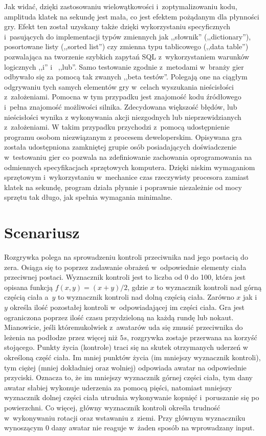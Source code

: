 \documentclass[brudnopis]{xmgr}
\begin{document}
Jak widać, dzięki zastosowaniu wielowątkowości i~zoptymalizowaniu kodu,
amplituda klatek na sekundę jest mała, co jest efektem pożądanym dla
płynności gry. Efekt ten został uzyskany także dzięki
wykorzystaniu specyficznych i~pasujących do implementacji typów zmiennych
jak ,,słownik'' (,,dictionary''), posortowane listy (,,sorted list'') czy
zmienna typu tablicowego (,,data table'') pozwalająca na tworzenie szybkich
zapytań SQL z~wykorzystaniem warunków logicznych ,,i'' i~ ,,lub''.
Samo testowanie zgodnie z~metodami w~branży gier odbywało się za pomocą
tak zwanych ,,beta testów''. Polegają one na ciągłym odgrywaniu tych samych
elementów gry w~celach wyszukania nieścisłości z~założeniami. Pomocna w
tym przypadku jest znajomość kodu źródłowego i~pełna znajomość możliwości
silnika. Zdecydowana większość błędów, lub nieścisłości wynika z
wykonywania akcji niezgodnych lub nieprzewidzianych z~założeniami. W
takim przypadku przychodzi z~pomocą udostępnienie programu osobom niezwiązanym
z procesem deweloperskim. Opisywana gra została udostępniona zamkniętej
grupie osób posiadających doświadczenie w~testowaniu gier co pozwala na
zdefiniowanie zachowania oprogramowania na odmiennych specyfikacjach sprzętowych
komputera. Dzięki niskim wymaganiom sprzętowym i~wykorzystaniu w~mechanice czas
rzeczywisty procesora zamiast klatek na sekundę, program działa płynnie i
poprawnie niezależnie od mocy sprzętu tak długo, jak spełnia wymagania
minimalne.

\section{Scenariusz}
Rozgrywka polega na sprowadzeniu kontroli przeciwnika nad jego postacią
do zera. Osiąga się to poprzez zadawanie obrażeń w~odpowiednie elementy
ciała przeciwnej postaci.
Wyznacznik kontroli jest to liczba od 0 do 100, która jest opisana funkcją
$f(x,y) = (x+y)/2$, gdzie $x$ to
wyznacznik kontroli nad górną częścią ciała a~$y$ to wyznacznik kontroli
nad dolną częścią ciała. Zarówno
$x$ jak i~$y$ określa ilość pozostałej kontroli w~odpowiadającej im części
ciała.
Gra jest ograniczona poprzez ilość czasu przydzieloną na każdą rundę
lub nokaut. Mianowicie, jeśli któremukolwiek z~awatarów uda się zmusić
przeciwnika do leżenia na podłodze przez więcej niż $5s$, rozgrywka zostaje
przerwana na korzyść stojącego.
Punkty życia (kontrole) traci się na skutek otrzymanych uderzeń w
określoną część ciała. Im mniej punktów życia (im mniejszy
wyznacznik kontroli), tym ciężej (mniej dokładniej oraz wolniej) odpowiada
awatar na odpowiednie przyciski. Oznacza to, że im mniejszy wyznacznik
górnej części ciała, tym dany awatar słabiej wykonuje
uderzenia za pomocą pięści, natomiast mniejszy wyznacznik dolnej części
ciała utrudnia wykonywanie kopnięć i~poruszanie się po powierzchni.
Co więcej, główny wyznacznik kontroli określa
trudność w~wykonywaniu rotacji oraz wstawaniu z~ziemi. Przy głównym
wyznaczniku wynoszącym 0
dany awatar nie reaguje w~żaden sposób na wprowadzany input.
\end{document}

